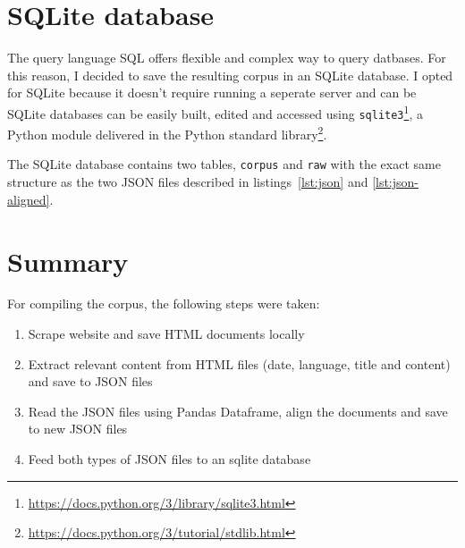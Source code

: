 \section{SQLite database}
The query language SQL offers flexible and complex way to query datbases. 
For this reason, I decided to save the resulting corpus in an SQLite database. 
I opted for SQLite because it doesn't require running a seperate server and can be SQLite databases can be easily built, edited and accessed using \texttt{sqlite3}\footnote{\url{https://docs.python.org/3/library/sqlite3.html}}, a Python module delivered in the Python standard library\footnote{\url{https://docs.python.org/3/tutorial/stdlib.html}}.

The SQLite database contains two tables, \texttt{corpus} and \texttt{raw} with the exact same structure as the two JSON files described in listings~\ref{lst:json} and \ref{lst:json-aligned}.


\section{Summary}
For compiling the corpus, the following steps were taken:
\begin{enumerate}
	\item Scrape website and save HTML documents locally
	\item Extract relevant content from HTML files (date, language, title and content) and save to JSON files
	\item Read the JSON files using Pandas Dataframe, align the documents and save to new JSON files
	\item Feed both types of JSON files to an sqlite database
\end{enumerate}

